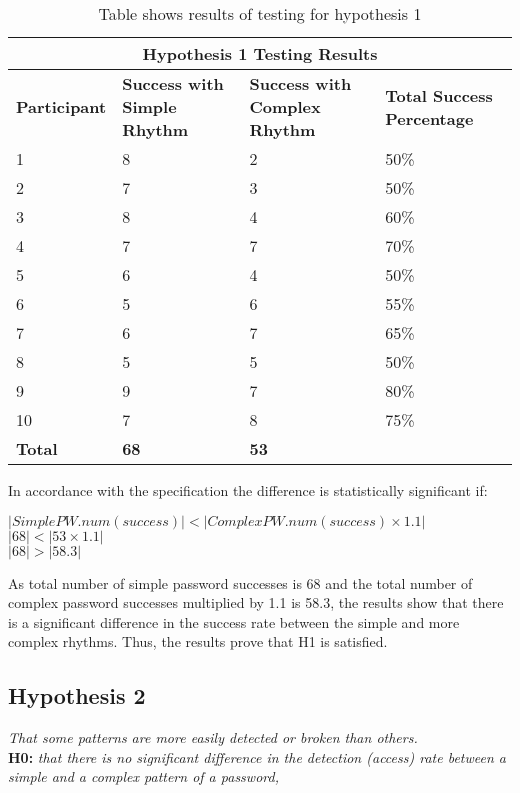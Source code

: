 \documentclass{article}
\begin{document}
{
\begin{table} [H]
\centering
\begin{tabular}{ |p{2cm}|p{4cm}|p{4cm}| p{4cm} | }
\hline
\multicolumn{4}{|c|}{\textbf{Hypothesis 1 Testing Results}} \\
\hline
\textbf{Participant} & \textbf{Success with Simple Rhythm} & \textbf{Success with Complex Rhythm} & \textbf{Total Success Percentage} \\
\hline
1 & 8 & 2 & 50\% \\
\hline
2 & 7 & 3 & 50\% \\
\hline
3 & 8 & 4 & 60\% \\
\hline
4 & 7 & 7 & 70\%  \\
\hline
5 & 6 & 4 & 50\% \\
\hline
6 & 5 & 6 & 55\% \\
\hline
7 & 6 & 7 & 65\% \\
\hline
8 & 5 & 5 & 50\% \\
\hline
9 & 9 & 7 & 80\% \\
\hline
10 & 7 & 8 & 75\% \\
\hline
\textbf{Total} & \textbf{68} & \textbf{53} & \\
\hline
\end{tabular}
\caption{Table shows results of testing for hypothesis 1}
\label{table:1}
\end{table}
}

In accordance with the specification the difference is statistically significant if: 
\begin{center}
    $ |SimplePW.num(success)| < |ComplexPW.num(success) \times 1.1|$ \\
    $ |68| < |53 \times 1.1| $ \\
    $ |68| > |58.3| $
\end{center}

As total number of simple password successes is 68 and the total number of complex password successes multiplied by 1.1 is 58.3, the results show that there is a significant difference in the success rate between the simple and more complex rhythms.  Thus, the results prove that H1 is satisfied.

\subsection{Hypothesis 2}
\begin{center}
\textit{That some patterns are more easily detected or broken than others.} \newline \\

\textbf{H0:} \textit{that	there	is no significant difference in	the	detection (access)	rate	between	a	simple	and	a	complex	pattern	of	a password,} \newline \\
\end{center}
\end{document}
